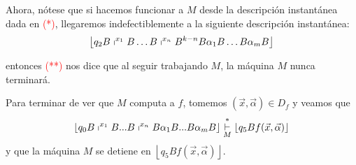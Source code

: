\begin{frame}
  \begin{block}{}
    \PN Ahora, nótese que si hacemos funcionar a $M$ desde la descripción instantánea dada en \textcolor{red}{(*)},
    llegaremos indefectiblemente a la siguiente descripción instantánea:
    \begin{equation*}
      \left\lfloor q_{2} B \shortmid^{x_{1}} B \dotsc B \shortmid^{x_{n}} B^{k-n}B \alpha_{1} B \dotsc B \alpha_{m} B
      \right\rfloor
    \end{equation*}

    \PN entonces \textcolor{red}{(**)} nos dice que al seguir trabajando $M$, la máquina $M$ nunca terminará.
  \end{block}

  \begin{block}{}
    \PN Para terminar de ver que $M$ computa a $f$, tomemos $(\vec{x},\vec{\alpha}) \in D_{f}$ y veamos que
    \begin{equation*}
      \left\lfloor q_{0}B\shortmid ^{x_{1}}B...B\shortmid ^{x_{n}}B\alpha
      _{1}B...B\alpha _{m}B\right\rfloor \overset{\ast }{\underset{M}{\vdash }}
      \left\lfloor q_{5}Bf(\vec{x},\vec{\alpha})\right\rfloor
    \end{equation*}
    \PN y que la máquina $M$ se detiene en $\left\lfloor q_{5} B f(\vec{x},\vec{\alpha})\right\rfloor$.
  \end{block}
\end{frame}
